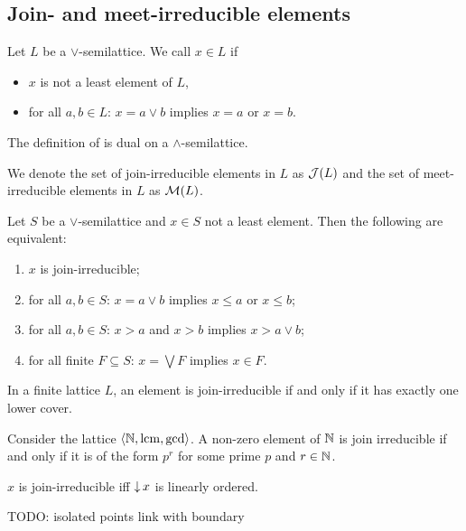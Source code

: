 \subsection{Join- and meet-irreducible elements}
\begin{definition}
Let $L$ be a $\vee$-semilattice. We call $x\in L$  if
\begin{itemize}
\item $x$ is not a least element of $L$,
\item for all $a,b\in L$: $x= a\vee b$ implies $x=a$ or $x=b$.
\end{itemize}
The definition of  is dual on a $\wedge$-semilattice.

We denote the set of join-irreducible elements in $L$ as $\operatorname{\mathcal{J}}(L)$ and the set of meet-irreducible elements in $L$ as $\operatorname{\mathcal{M}}(L)$.
\end{definition}

\begin{lemma} \label{joinIrreducibleLemma}
Let $S$ be a $\vee$-semilattice and $x\in S$ not a least element. Then the following are equivalent:
\begin{enumerate}
\item $x$ is join-irreducible;
\item for all $a,b\in S$: $x= a\vee b$ implies $x \leq a$ or $x \leq b$;
\item for all $a,b\in S$: $x > a$ and $x > b$ implies $x > a\vee b$;
\item for all finite $F\subseteq S$: $x = \bigvee F$ implies $x\in F$.
\end{enumerate}
\end{lemma}

\begin{lemma}
In a finite lattice $L$, an element is join-irreducible if and only if it
has exactly one lower cover.
\end{lemma}

\begin{example}
Consider the lattice $\left\langle \mathbb{N},\operatorname{lcm}, \gcd \right\rangle$. A non-zero element of $\mathbb{N}$ is join irreducible if and only if it is of the form $p^r$ for some prime $p$ and $r\in\mathbb{N}$.
\end{example}

\begin{proposition}
$x$ is join-irreducible iff $\operatorname{\downarrow} x$ is linearly ordered.
\end{proposition}

TODO: isolated points
link with boundary

